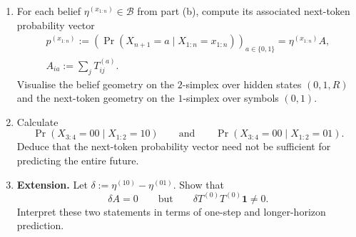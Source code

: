 \documentclass[11pt]{article}
\begin{document}
\begin{exercise}
\begin{enumerate}
    \item For each belief $\eta^{(x_{1:n})}\in\mathcal B$ from part (b),
      compute its associated next-token probability vector
      \[
        \begin{gathered}
        p^{(x_{1:n})}
        :=\left(
          \Pr(X_{n+1}=a\mid X_{1:n}=x_{1:n})
        \right)_{a\in\{0,1\}}
        =\eta^{(x_{1:n})}A,\\[1mm]
        A_{ia}:=\sum_jT^{(a)}_{ij}.
        \end{gathered}
      \]
      Visualise the belief geometry on the $2$-simplex over hidden states
      $(0,1,R)$ and the next-token geometry on the $1$-simplex over symbols
      $(0,1)$.

    \item Calculate
      \[
        \Pr(X_{3:4}=00\mid X_{1:2}=10)
        \qquad\text{and}\qquad
        \Pr(X_{3:4}=00\mid X_{1:2}=01).
      \]
      Deduce that the next-token probability vector need not be sufficient for
      predicting the entire future.

    \item \textbf{Extension.} Let
      $\delta:=\eta^{(10)}-\eta^{(01)}$. Show that
      \[
        \delta A=0
        \qquad\text{but}\qquad
        \delta T^{(0)}T^{(0)}\mathbf 1\neq0.
      \]
      Interpret these two statements in terms of one-step and longer-horizon
      prediction.
  \end{enumerate}
\end{exercise}
\end{document}
